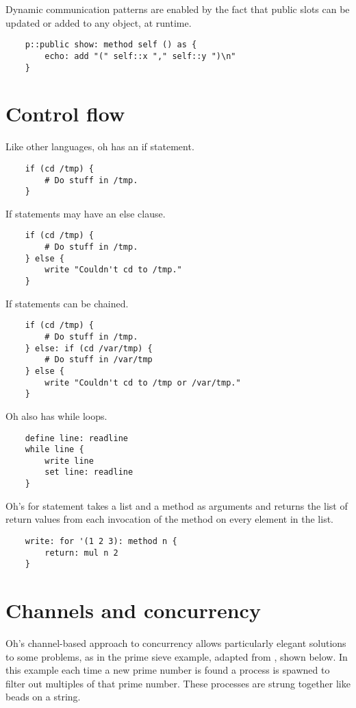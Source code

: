 \documentclass[12pt]{book}
\begin{document}
Dynamic communication patterns are enabled by the fact that public slots
can be updated or added to any object, at runtime.

\begin{lstlisting}
	p::public show: method self () as {
		echo: add "(" self::x "," self::y ")\n"
	}
\end{lstlisting}


\section{Control flow}

Like other languages, oh has an if statement.

\begin{lstlisting}
	if (cd /tmp) {
		# Do stuff in /tmp.
	}
\end{lstlisting}

If statements may have an else clause.

\begin{lstlisting}
	if (cd /tmp) {
		# Do stuff in /tmp.
	} else {
		write "Couldn't cd to /tmp."
	}
\end{lstlisting}

If statements can be chained.

\begin{lstlisting}
	if (cd /tmp) {
		# Do stuff in /tmp.
	} else: if (cd /var/tmp) {
		# Do stuff in /var/tmp
	} else {
		write "Couldn't cd to /tmp or /var/tmp."
	}
\end{lstlisting}

Oh also has while loops.

\begin{lstlisting}
	define line: readline
	while line {
		write line
		set line: readline
	}
\end{lstlisting}

Oh's for statement takes a list and a method as arguments and returns the
list of return values from each invocation of the method on every element
in the list.

\begin{lstlisting}
	write: for '(1 2 3): method n {
	    return: mul n 2
	}
\end{lstlisting}


\section{Channels and concurrency}

Oh's channel-based approach to concurrency allows particularly elegant
solutions to some problems, as in the prime sieve example, adapted
from \cite{NALfCwM}, shown below. In this example each time a new prime
number is found a process is spawned to filter out multiples of that
prime number. These processes are strung together like beads on a string.
\end{document}
